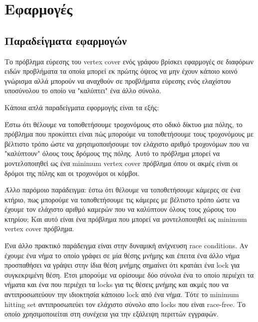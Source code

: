 \chapter{Εφαρμογές} %

\label{Chapter4} %

\section{Παραδείγματα εφαρμογών}
Το πρόβλημα εύρεσης του vertex cover ενός γράφου βρίσκει εφαρμογές σε διαφόρων ειδών προβλήματα τα οποία μπορεί εκ πρώτης όψεος να μην έχουν κάποιο κοινό γνώρισμα αλλά μπορούν να αναχθούν σε προβλήματα εύρεσης ενός ελαχίστου υποσύνολου το οποίο να "καλύπτει" ένα άλλο σύνολο.

\par{
Κάποια απλά παραδείγματα εφορμογής είναι τα εξής:

Έστω ότι θέλουμε να τοποθετήσουμε τροχονόμους στο οδικό δίκτυο μια πόλης, το πρόβλημα που προκύπτει είναι πώς μπορούμε να τοποθετήσουμε τους τροχονόμους με βέλτιστο τρόπο ώστε να χρησιμοποιήσουμε τον ελάχιστο αριθμό τροχονόμων που να "καλύπτουν" όλους τους δρόμους της πόλης. 
Αυτό το πρόβλημα μπορεί να μοντελοποιηθεί ως ένα minimum vertex cover πρόβλημα όπου οι ακμές είναι οι δρόμοι της πόλης και οι τροχονόμοι οι κόμβοι.
}
\par{
Άλλο παρόμοιο παράδειγμα: έστω ότι θέλουμε να τοποθετήσουμε κάμερες σε ένα κτήριο, πως μπορούμε να τοποθετήσουμε τις κάμερες με βέλτιστο τρόπο ώστε να έχουμε τον ελάχιστο αριθμό καμερών που να καλύπτουν όλους τους χώρους του κτηρίου; Και αυτό είναι ένα πρόβλημα που μπορεί να μοντελοποιηθεί ως minimum vertex cover πρόβλημα.
}

\par{
Ένα άλλο πρακτικό παράδειγμα είναι στην δυναμική ανίχνευση race conditions. Αν έχουμε ένα νήμα το οποίο γράφει σε μία θέσης μνήμης και έπειτα ένα άλλο νήμα προσπαθήσει να γράψει στην ίδια θέση μνήμης σημαίνει ότι κρατάει ένα lock για συγκεκριμένη θέση. Έτσι μπορούμε να ορίσουμε δύο σύνολα ένα το οποίο περιέχει τα νήματα και ένα που περιέχει τα locks για τις θέσεις μνήμης και ακμές που να αντιπροσωπεύουν την ιδιοκτησία κάποιου lock από ένα νήμα. Τότε το minimum hitting set αντιπροσωπεύει τον ελάχιστο σύνολο απο locks που είναι race-free. Το οποίο χρησιμοποιείται στη συνέχεια για την εξάλειψη περιττών εγγραφών.\cite{DataRaces}
}

